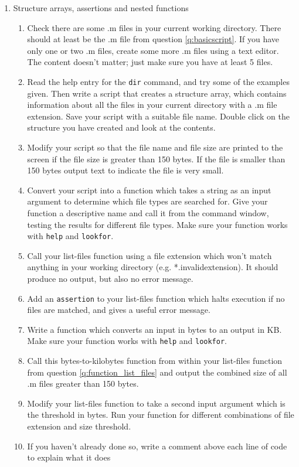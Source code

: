 \documentclass{article}
\begin{document}
	\begin{enumerate}[resume]
		\item Structure arrays, assertions and nested functions
		\begin{enumerate}
			\item Check there are some .m files in your current working directory. There should at least be the .m file from question \ref{q:basicscript}. If you have only one or two .m files, create some more .m files using a text editor. The content doesn't matter; just make sure you have at least 5 files.
			\item Read the help entry for the \texttt{dir} command, and try some of the examples given. Then write a script that creates a structure array, which contains information about all the files in your current directory with a .m file extension. Save your script with a suitable file name. Double click on the structure you have created and look at the contents.
			\item Modify your script so that the file name and file size are printed to the screen if the file size is greater than 150 bytes. If the file is smaller than 150 bytes output text to indicate the file is very small.
			\item Convert your script into a function which takes a string as an input argument to determine which file types are searched for. Give your function a descriptive name and call it from the command window, testing the results for different file types. Make sure your function works with \texttt{help} and \texttt{lookfor}.
			\item Call your list-files function using a file extension which won't match anything in your working directory (e.g. *.invalidextension).
			It should produce no output, but also no error message.
			\item Add an \texttt{assertion} to your list-files function which halts execution if no files are matched, and gives a useful error message. 
			\label{q:function_list_files}
			\item Write a function which converts an input in bytes to an output in KB. Make sure your function works with \texttt{help} and \texttt{lookfor}.
			\item Call this bytes-to-kilobytes function from within your list-files function from question \ref{q:function_list_files} and output the combined size of all .m files greater than 150 bytes.
			\item Modify your list-files function to take a second input argument which is the threshold in bytes. Run your function for different combinations of file extension and size threshold.
			\item If you haven't already done so, write a comment above each line of code to explain what it does
		\end{enumerate}
	\end{enumerate}
	
\end{document}
